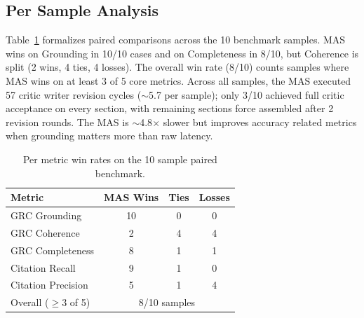\documentclass[conference]{IEEEtran}
\begin{document}
\subsection{Per Sample Analysis}
Table~\ref{tab:winrate} formalizes paired comparisons across the 10 benchmark samples. MAS wins on Grounding in 10/10 cases and on Completeness in 8/10, but Coherence is split (2 wins, 4 ties, 4 losses). The overall win rate (8/10) counts samples where MAS wins on at least 3 of 5 core metrics. Across all samples, the MAS executed 57 critic writer revision cycles ($\sim$5.7 per sample); only 3/10 achieved full critic acceptance on every section, with remaining sections force assembled after 2 revision rounds. The MAS is ${\sim}$4.8$\times$ slower but improves accuracy related metrics when grounding matters more than raw latency.

\begin{table}[t]
\caption{Per metric win rates on the 10 sample paired benchmark.}
\label{tab:winrate}
\centering
\small
\begin{tabular}{lccc}
\toprule
\textbf{Metric} & \textbf{MAS Wins} & \textbf{Ties} & \textbf{Losses} \\
\midrule
GRC Grounding & 10 & 0 & 0 \\
GRC Coherence & 2 & 4 & 4 \\
GRC Completeness & 8 & 1 & 1 \\
Citation Recall & 9 & 1 & 0 \\
Citation Precision & 5 & 1 & 4 \\
\midrule
Overall ($\geq$3 of 5) & \multicolumn{3}{c}{8/10 samples} \\
\bottomrule
\end{tabular}
\end{table}
\end{document}
